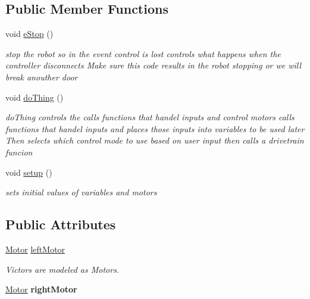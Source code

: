 \subsection*{Public Member Functions}
\begin{DoxyCompactItemize}
\item 
\mbox{\label{class_basic_drive_controller_a460f99786b7e701d72a91466f5cc8041}} 
void \mbox{\hyperlink{class_basic_drive_controller_a460f99786b7e701d72a91466f5cc8041}{e\+Stop}} ()
\begin{DoxyCompactList}\small\item\em stop the robot so in the event control is lost controls what happens when the controller disconnects Make sure this code results in the robot stopping or we will break anouther door \end{DoxyCompactList}\item 
\mbox{\label{class_basic_drive_controller_a11b639d12205bb597f07206df6721950}} 
void \mbox{\hyperlink{class_basic_drive_controller_a11b639d12205bb597f07206df6721950}{do\+Thing}} ()
\begin{DoxyCompactList}\small\item\em do\+Thing controls the calls functions that handel inputs and control motors calls functions that handel inputs and places those inputs into variables to be used later Then selects which control mode to use based on user input then calls a drivetrain funcion \end{DoxyCompactList}\item 
\mbox{\label{class_basic_drive_controller_a511911167940331dcf369aaf925e9fde}} 
void \mbox{\hyperlink{class_basic_drive_controller_a511911167940331dcf369aaf925e9fde}{setup}} ()
\begin{DoxyCompactList}\small\item\em sets initial values of variables and motors \end{DoxyCompactList}\end{DoxyCompactItemize}
\subsection*{Public Attributes}
\begin{DoxyCompactItemize}
\item 
\mbox{\label{class_basic_drive_controller_a445c2c05f8d0096c27a8778f55735cec}} 
\mbox{\hyperlink{class_motor}{Motor}} \mbox{\hyperlink{class_basic_drive_controller_a445c2c05f8d0096c27a8778f55735cec}{left\+Motor}}
\begin{DoxyCompactList}\small\item\em Victors are modeled as Motors. \end{DoxyCompactList}\item 
\mbox{\label{class_basic_drive_controller_aa7a52433c7991724f24d317fae6805a9}} 
\mbox{\hyperlink{class_motor}{Motor}} {\bfseries right\+Motor}
\end{DoxyCompactItemize}
